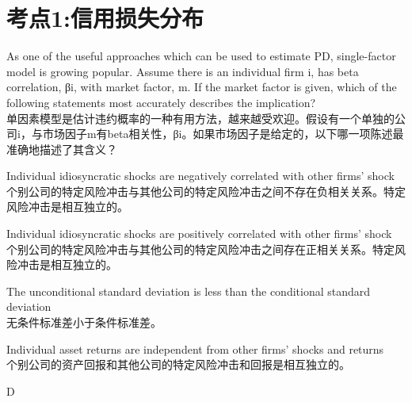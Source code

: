 \documentclass{article}
\newcounter{question} %
\begin{document}
 \tableofcontents %
\newpage




\section{考点1:信用损失分布}
\setcounter{question}{0}

\begin{question}
    As one of the useful approaches which can be used to estimate PD, single-factor model is growing popular. Assume there is an individual firm i, has beta correlation, βi, with market factor, m. If the market factor is given, which of the following statements most accurately describes the implication?\\
    单因素模型是估计违约概率的一种有用方法，越来越受欢迎。假设有一个单独的公司i，与市场因子m有beta相关性，βi。如果市场因子是给定的，以下哪一项陈述最准确地描述了其含义？
\end{question}

\begin{choices}
    \item Individual idiosyncratic shocks are negatively correlated with other firms' shock\\
    个别公司的特定风险冲击与其他公司的特定风险冲击之间不存在负相关关系。特定风险冲击是相互独立的。
    \item Individual idiosyncratic shocks are positively correlated with other firms' shock\\
    个别公司的特定风险冲击与其他公司的特定风险冲击之间存在正相关关系。特定风险冲击是相互独立的。
    \item The unconditional standard deviation is less than the conditional standard deviation\\
    无条件标准差小于条件标准差。
    \item Individual asset returns are independent from other firms' shocks and returns\\
    个别公司的资产回报和其他公司的特定风险冲击和回报是相互独立的。
\end{choices}

\begin{correctanswer}
    D
\end{correctanswer}
\end{document}
